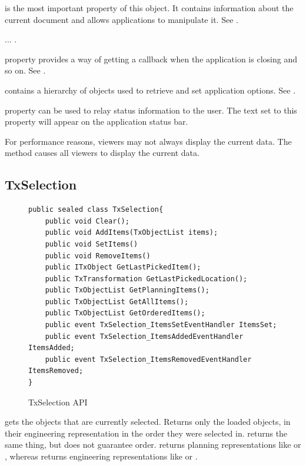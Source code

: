  is the most important property of this object.
It contains information about the current document and allows applications to manipulate it.
See .

 ... .

 property provides a way of getting a callback when the application is closing and so on.
See .

 contains a hierarchy of objects used to retrieve and set application options.
See .

 property can be used to relay status information to the user.
The text set to this property will appear on the application status bar.

For performance reasons, viewers may not always display the current data.
The method  causes all viewers to display the current data.

\subsection{TxSelection}

\begin{figure}[H]
    \caption{TxSelection API}
    \centering
    \begin{verbatim}
public sealed class TxSelection{
    public void Clear();
    public void AddItems(TxObjectList items);
    public void SetItems()
    public void RemoveItems()
    public ITxObject GetLastPickedItem();
    public TxTransformation GetLastPickedLocation();
    public TxObjectList GetPlanningItems();
    public TxObjectList GetAllItems();
    public TxObjectList GetOrderedItems();
    public event TxSelection_ItemsSetEventHandler ItemsSet;
    public event TxSelection_ItemsAddedEventHandler ItemsAdded;
    public event TxSelection_ItemsRemovedEventHandler ItemsRemoved;
}
    \end{verbatim}
    \label{fig:CodeTxSelection}
\end{figure}

 gets the objects that are currently selected.
Returns only the loaded objects, in their engineering representation in the order they were selected in.
 returns the same thing, but does not guarantee order.
 returns planning representations like  or , whereas  returns engineering representations like  or .


